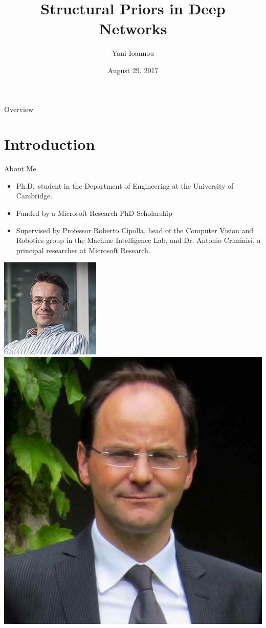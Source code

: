 \documentclass[t,xcolor=dvipsnames]{beamer}
\title[Structural Priors in Deep Networks] %
{Structural Priors in Deep Networks}
\author[Yani Ioannou]
{Yani Ioannou}
\institute[University of Cambridge] %
{University of Cambridge}
\date{August 29, 2017}
\begin{document}


\begin{frame}
  \titlepage
\end{frame}






\begin{frame}{Overview}
\tableofcontents
\end{frame}


\section{Introduction}

\begin{frame}{About Me}
\begin{itemize}
\item Ph.D.\ student in the Department of Engineering at the University of Cambridge.
\item Funded by a Microsoft Research PhD Scholarship
\item Supervised by Professor Roberto Cipolla, head of the Computer Vision and Robotics group in the Machine Intelligence Lab, and Dr. Antonio Criminisi, a principal researcher at Microsoft Research.
\end{itemize}
\centering
\includegraphics[width=0.207\linewidth]{antonio}~
\includegraphics[width=0.2\linewidth]{roberto}
\end{frame}
\end{document}
